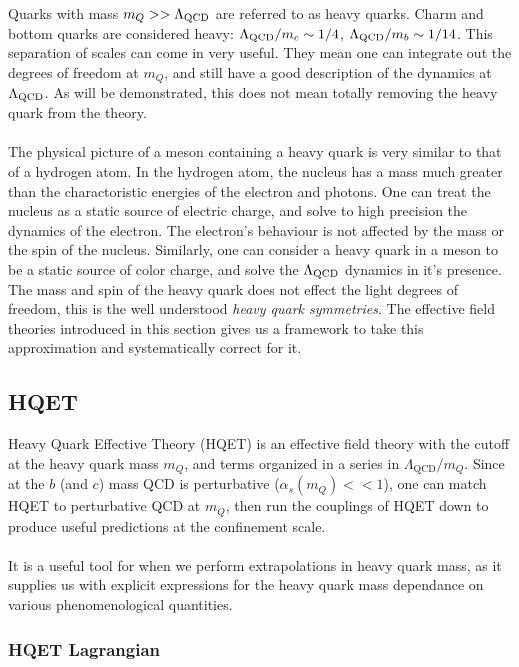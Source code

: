 Quarks with mass $m_Q >> \Lambda_{\text{QCD}}$ are referred to as heavy quarks. Charm and bottom quarks are considered heavy: $\Lambda_{\text{QCD}}/m_c \sim 1/4$, $\Lambda_{\text{QCD}}/m_b \sim 1/14$. This separation of scales can come in very useful. They mean one can integrate out the degrees of freedom at $m_Q$, and still have a good description of the dynamics at $\Lambda_{\text{QCD}}$. As will be demonstrated, this does not mean totally removing the heavy quark from the theory.
\\ \\
The physical picture of a meson containing a heavy quark is very similar to that of a hydrogen atom. In the hydrogen atom, the nucleus has a mass much greater than the charactoristic energies of the electron and photons. One can treat the nucleus as a static source of electric charge, and solve to high precision the dynamics of the electron. The electron's behaviour is not affected by the mass or the spin of the nucleus. Similarly, one can consider a heavy quark in a meson to be a static source of color charge, and solve the $\Lambda_{\text{QCD}}$ dynamics in it's presence. The mass and spin of the heavy quark does not effect the light degrees of freedom, this is the well understood {\it{heavy quark symmetries}}. The effective field theories introduced in this section gives us a framework to take this approximation and systematically correct for it.

\subsection{HQET}

Heavy Quark Effective Theory (HQET) is an effective field theory with the cutoff at the heavy quark mass $m_Q$, and terms organized in a series in $\Lambda_{\text{QCD}}/m_Q$. Since at the $b$ (and $c$) mass QCD is perturbative ($\alpha_s(m_Q) << 1$), one can match HQET to perturbative QCD at $m_Q$, then run the couplings of HQET down to produce useful predictions at the confinement scale.
\\ \\
It is a useful tool for when we perform extrapolations in heavy quark mass, as it supplies us with explicit expressions for the heavy quark mass dependance on various phenomenological quantities.

\subsubsection{HQET Lagrangian}

